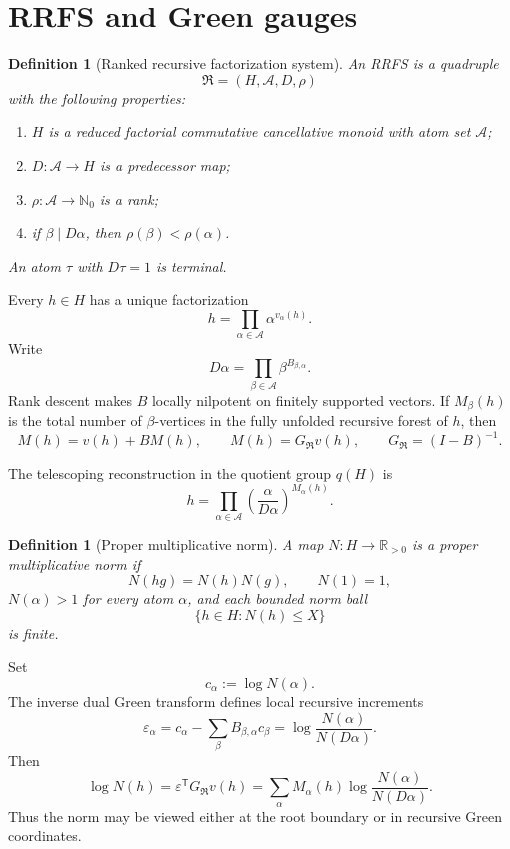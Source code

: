 \documentclass[11pt]{article}
\newtheorem{definition}[theorem]{Definition}
\newcommand{\RR}{\mathbb R}
\newcommand{\NN}{\mathbb N}
\newcommand{\cA}{\mathcal A}
\newcommand{\cR}{\mathfrak R}
\begin{document}
\section{RRFS and Green gauges}

\begin{definition}[Ranked recursive factorization system]
An RRFS is a quadruple
\[
\cR=(H,\cA,D,\rho)
\]
with the following properties:
\begin{enumerate}[label=(\roman*)]
\item $H$ is a reduced factorial commutative cancellative monoid with atom set $\cA$;
\item $D:\cA\to H$ is a predecessor map;
\item $\rho:\cA\to\NN_0$ is a rank;
\item if $\beta\mid D\alpha$, then $\rho(\beta)<\rho(\alpha)$.
\end{enumerate}
An atom $\tau$ with $D\tau=1$ is terminal.
\end{definition}

Every $h\in H$ has a unique factorization
\[
h=\prod_{\alpha\in\cA}\alpha^{v_\alpha(h)}.
\]
Write
\[
D\alpha=\prod_{\beta\in\cA}\beta^{B_{\beta,\alpha}}.
\]
Rank descent makes $B$ locally nilpotent on finitely supported vectors. If $M_\beta(h)$ is the total number of $\beta$-vertices in the fully unfolded recursive forest of $h$, then
\[
M(h)=v(h)+BM(h),
\qquad
M(h)=G_{\cR}v(h),
\qquad
G_{\cR}=(I-B)^{-1}.
\]

The telescoping reconstruction in the quotient group $q(H)$ is
\begin{equation}\label{eq:reconstruction}
h=\prod_{\alpha\in\cA}
\left(\frac{\alpha}{D\alpha}\right)^{M_\alpha(h)}.
\end{equation}

\begin{definition}[Proper multiplicative norm]
A map $N:H\to\RR_{>0}$ is a proper multiplicative norm if
\[
N(hg)=N(h)N(g),\qquad N(1)=1,
\]
$N(\alpha)>1$ for every atom $\alpha$, and each bounded norm ball
\[
\{h\in H:N(h)\le X\}
\]
is finite.
\end{definition}

Set
\[
c_\alpha:=\log N(\alpha).
\]
The inverse dual Green transform defines local recursive increments
\begin{equation}\label{eq:eps}
\varepsilon_\alpha
=c_\alpha-\sum_\beta B_{\beta,\alpha}c_\beta
=\log\frac{N(\alpha)}{N(D\alpha)}.
\end{equation}
Then
\begin{equation}\label{eq:greenenergy}
\log N(h)=\varepsilon^{\mathsf T}G_{\cR}v(h)
=\sum_\alpha M_\alpha(h)\log\frac{N(\alpha)}{N(D\alpha)}.
\end{equation}
Thus the norm may be viewed either at the root boundary or in recursive Green coordinates.
\end{document}
